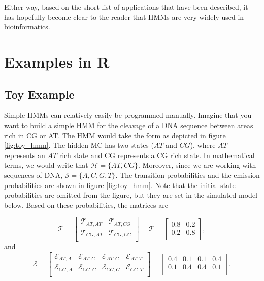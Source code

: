 \documentclass{article}\usepackage[]{graphicx}\usepackage[]{color}
\begin{document}
Either way, based on the short list of applications that have been described, it has hopefully become clear to the reader that HMMs are very widely used in bioinformatics. 

\section{Examples in R}

\subsection{Toy Example}\label{Section:ToyExample}

Simple HMMs can relatively easily be programmed manually. Imagine that you want to build a simple HMM for the cleavage of a DNA sequence between areas rich in CG or AT. The HMM would take the form as depicted in figure \ref{fig:toy_hmm}. The hidden MC has two states ($AT$ and $CG$), where $AT$ represents an $AT$ rich state and CG represents a CG rich state. In mathematical terms, we would write that $\mathcal{H} = \{AT, CG\}$. Moreover, since we are working with sequences of DNA, $\mathcal{S} = \{A,C,G,T\}$. The transition probabilities and the emission probabilities are shown in figure \ref{fig:toy_hmm}. Note that the initial state probabilities are omitted from the figure, but they are set in the simulated model below. Based on these probabilities, the matrices are

\begin{equation*}
  \mathcal{T} = \begin{bmatrix}
      \mathcal{T}_{AT, AT} & \mathcal{T}_{AT, CG} \\
      \mathcal{T}_{CG, AT} & \mathcal{T}_{CG, CG}  \\
  \end{bmatrix} = \mathcal{T} = \begin{bmatrix}
      0.8 & 0.2 \\
      0.2 & 0.8  \\
  \end{bmatrix},
\end{equation*}
and 
\begin{equation*}
  \mathcal{E} = \begin{bmatrix}
      \mathcal{E}_{AT, A} & \mathcal{E}_{AT, C} & \mathcal{E}_{AT, G} & \mathcal{E}_{AT, T}\\
      \mathcal{E}_{CG, A} & \mathcal{E}_{CG, C} & \mathcal{E}_{CG, G} & \mathcal{E}_{CG, T}\\
  \end{bmatrix} = \begin{bmatrix}
     0.4 & 0.1 & 0.1 & 0.4 \\
      0.1 & 0.4 & 0.4 & 0.1 \\
  \end{bmatrix}.
\end{equation*}
\end{document}
